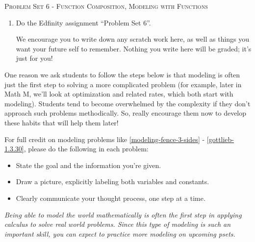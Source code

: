 \documentclass{article}
\newcommand{\doedfinity}[2][\newpage]{
  \begin{problem}[#1]
    Do the Edfinity assignment ``Problem Set #2''.

    We encourage you to write down any scratch work here, as well as
    things you want your future self to remember. Nothing you write
    here will be graded; it's just for you!
  \end{problem}
}
\begin{document}
\begin{center}
  \large\textsc{Problem Set 6 - Function Composition, Modeling with Functions}
\end{center}

\begin{enumerate}
\item  {}

  \doedfinity{6}

\end{enumerate}
\begin{workshop}
  One reason we ask students to follow the steps below is that
  modeling is often just the first step to solving a more complicated
  problem (for example, later in Math M, we'll look at optimization
  and related rates, which both start with modeling). Students tend to
  become overwhelmed by the complexity if they don't approach such
  problems methodically. So, really encourage them now to develop
  these habits that will help them later!  
\end{workshop}

For full credit on modeling problems like \ref{modeling-fence-3-sides} - \ref{gottlieb-1.3.30}, please do the following in each problem:
{
  \begin{itemize}[nosep]
  \item State the goal and the information you're given.
  \item Draw a picture, explicitly labeling both variables and constants.
  \item Clearly communicate your thought process, one step at a time. 
  \end{itemize}
}

\begin{problemonly}
  \emph{Being able to model the world mathematically is often the first step in applying calculus to solve real world problems. Since this type of modeling is such an important skill, you can expect to practice more modeling on upcoming psets.}
\end{problemonly}
\end{document}
